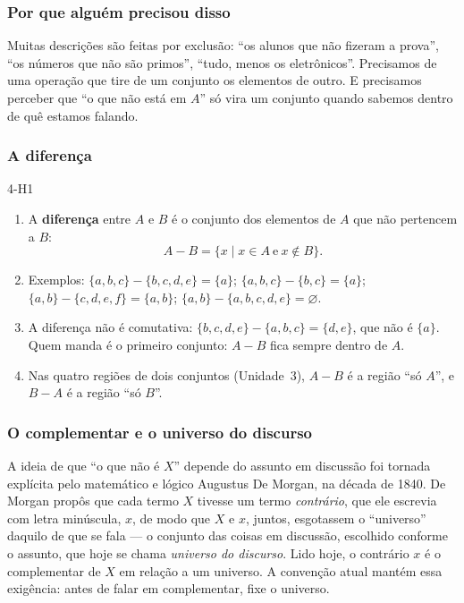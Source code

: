 \DeOndeVem

\subsubsection{Por que alguém precisou disso}
Muitas descrições são feitas por exclusão: \enquote{os alunos que não fizeram a prova}, \enquote{os números que não são primos}, \enquote{tudo, menos os eletrônicos}. Precisamos de uma operação que tire de um conjunto os elementos de outro. E precisamos perceber que \enquote{o que não está em $A$} só vira um conjunto quando sabemos dentro de quê estamos falando.

\subsubsection{A diferença}
\begin{construcao}[diferença]{4-H1}
\begin{enumerate}[label=(\arabic*)]
  \item A \textbf{diferença} entre $A$ e $B$ é o conjunto dos elementos de $A$ que não pertencem a $B$:
\[
A-B=\{x\mid x\in A\ \text{e}\ x\notin B\}.
\]
  \item Exemplos: $\{a,b,c\}-\{b,c,d,e\}=\{a\}$; $\{a,b,c\}-\{b,c\}=\{a\}$; $\{a,b\}-\{c,d,e,f\}=\{a,b\}$; $\{a,b\}-\{a,b,c,d,e\}=\varnothing$.
  \item A diferença não é comutativa: $\{b,c,d,e\}-\{a,b,c\}=\{d,e\}$, que não é $\{a\}$. Quem manda é o primeiro conjunto: $A-B$ fica sempre dentro de $A$.
  \item Nas quatro regiões de dois conjuntos (Unidade~3), $A-B$ é a região \enquote{só $A$}, e $B-A$ é a região \enquote{só $B$}.
\end{enumerate}
\end{construcao}

\subsubsection{O complementar e o universo do discurso}
A ideia de que \enquote{o que não é $X$} depende do assunto em discussão foi tornada explícita pelo matemático e lógico Augustus De Morgan, na década de 1840. De Morgan propôs que cada termo $X$ tivesse um termo \emph{contrário}, que ele escrevia com letra minúscula, $x$, de modo que $X$ e $x$, juntos, esgotassem o \enquote{universo} daquilo de que se fala — o conjunto das coisas em discussão, escolhido conforme o assunto, que hoje se chama \emph{universo do discurso}. Lido hoje, o contrário $x$ é o complementar de $X$ em relação a um universo. A convenção atual mantém essa exigência: antes de falar em complementar, fixe o universo.

